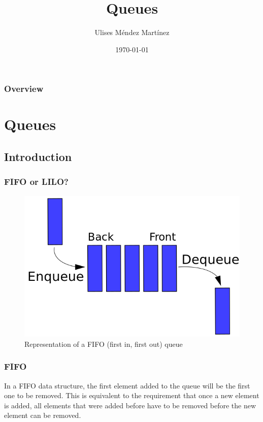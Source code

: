 \documentclass{beamer}
\title[Queues]{Queues} %
\author{Ulises M\'endez Mart\'{i}nez} %
\institute[UTM] %
{
Algorist Weekly Talks \\ %
\medskip
\textit{ulisesmdzmtz@gmail.com} %
}
\date{\today} %
\begin{document}
\begin{frame}
\titlepage %
\end{frame}


\begin{frame}
\frametitle{Overview} %
\tableofcontents %
\end{frame}

\section{Queues} 
\subsection{Introduction}
\begin{frame}
\frametitle{ FIFO or LILO?}
\begin{figure}
	\includegraphics[width=0.7\linewidth]{queue.png}
	\caption{Representation of a FIFO (first in, first out) queue}
\end{figure}
\end{frame}

\begin{frame}
\frametitle{ FIFO }
In a FIFO data structure, the first element added to the queue will be the first one to be removed. This is equivalent to the requirement that once a new element is added, all elements that were added before have to be removed before the new element can be removed.
\end{frame} 
\end{document}
